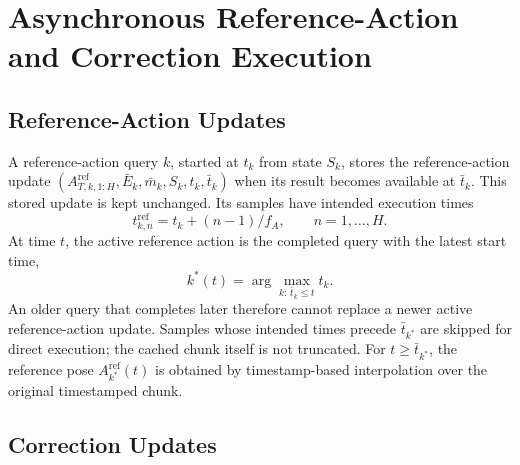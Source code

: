 \documentclass[conference]{IEEEtran}
\begin{document}
\section{Asynchronous Reference-Action and Correction Execution}

\subsection{Reference-Action Updates}

A reference-action query $k$, started at $t_k$ from state $S_k$, stores the reference-action update $(A_{T,k,1:H}^{\mathrm{ref}},\bar E_k,\bar m_k,S_k,t_k,\bar t_k)$ when its result becomes available at $\bar t_k$. This stored update is kept unchanged. Its samples have intended execution times
\begin{equation}
    t_{k,n}^{\mathrm{ref}}=t_k+(n-1)/f_A,
    \qquad n=1,\ldots,H.
    \label{eq:supp_reference_timestamps}
\end{equation}
At time $t$, the active reference action is the completed query with the latest start time,
\begin{equation}
    k^*(t)=\arg\max_{k:\,\bar t_k\leq t}t_k.
    \label{eq:supp_active_reference}
\end{equation}
An older query that completes later therefore cannot replace a newer active reference-action update. Samples whose intended times precede $\bar t_{k^*}$ are skipped for direct execution; the cached chunk itself is not truncated. For $t\geq\bar t_{k^*}$, the reference pose $A_{k^*}^{\mathrm{ref}}(t)$ is obtained by timestamp-based interpolation over the original timestamped chunk.

\subsection{Correction Updates}
\end{document}

